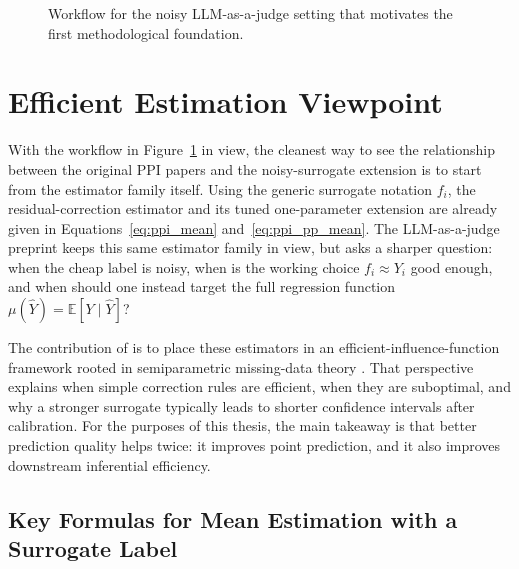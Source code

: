 \begin{figure}[htbp]
\centering
{}
\caption[Noisy LLM-as-a-judge workflow]{Workflow for the noisy LLM-as-a-judge setting that motivates the first methodological foundation.}
\label{fig:foundation1_workflow}
\end{figure}

\section{Efficient Estimation Viewpoint}

With the workflow in Figure~\ref{fig:foundation1_workflow} in view, the cleanest way to see the relationship between the original PPI papers and the noisy-surrogate extension is to start from the estimator family itself. Using the generic surrogate notation $f_i$, the residual-correction estimator and its tuned one-parameter extension are already given in Equations~\eqref{eq:ppi_mean} and~\eqref{eq:ppi_pp_mean}. The LLM-as-a-judge preprint keeps this same estimator family in view, but asks a sharper question: when the cheap label is noisy, when is the working choice $f_i\approx Y_i$ good enough, and when should one instead target the full regression function $\mu(\widehat{Y})=\mathbb{E}[Y\mid \widehat{Y}]$?

The contribution of \textcite{llmjudge_eif} is to place these estimators in an efficient-influence-function framework rooted in semiparametric missing-data theory \parencite{robins1995, tsiatis2006}. That perspective explains when simple correction rules are efficient, when they are suboptimal, and why a stronger surrogate typically leads to shorter confidence intervals after calibration. For the purposes of this thesis, the main takeaway is that better prediction quality helps twice: it improves point prediction, and it also improves downstream inferential efficiency.

\subsection{Key Formulas for Mean Estimation with a Surrogate Label}

